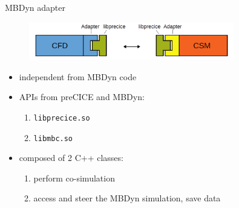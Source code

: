 \documentclass[10pt,t]{beamer}
\begin{document}
\begin{frame}{MBDyn adapter}
    \begin{figure}
        \centering
        \includegraphics[width=0.8\textwidth]{images/adapter_scheme.png}
    \end{figure}
    
    \vspace{3mm}
    
    \begin{itemize}
     \itemsep 8pt
        \item independent from MBDyn code
        \item APIs from preCICE and MBDyn:
        \begin{enumerate}
            \itemsep 5pt
            \item \texttt{libprecice.so}
            \item \texttt{libmbc.so} 
        \end{enumerate}
        
        \item composed of 2 C++ classes:
        \begin{enumerate}
            \itemsep 5pt
            \item perform co-simulation
            \item access and steer the MBDyn simulation, save data
        \end{enumerate}
        
    \end{itemize}
\end{frame}
\end{document}
